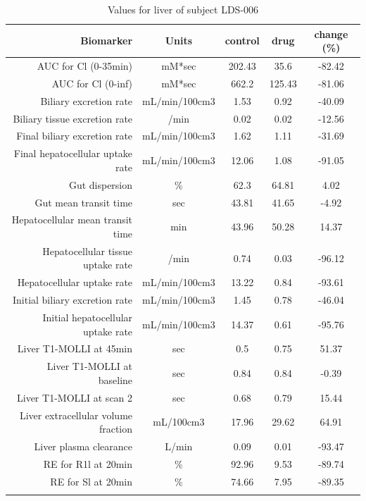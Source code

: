 \documentclass{epflreport}%
\begin{document}
%
\clearpage%
\begin{longtable}{rcccc}%
\hline%
Biomarker&Units&control&drug&change (\%)\\%
\hline%
AUC for Cl (0{-}35min)&mM*sec&202.43&35.6&{-}82.42\\%
AUC for Cl (0{-}inf)&mM*sec&662.2&125.43&{-}81.06\\%
Biliary excretion rate&mL/min/100cm3&1.53&0.92&{-}40.09\\%
Biliary tissue excretion rate&/min&0.02&0.02&{-}12.56\\%
Final biliary excretion rate&mL/min/100cm3&1.62&1.11&{-}31.69\\%
Final hepatocellular uptake rate&mL/min/100cm3&12.06&1.08&{-}91.05\\%
Gut dispersion&\%&62.3&64.81&4.02\\%
Gut mean transit time&sec&43.81&41.65&{-}4.92\\%
Hepatocellular mean transit time&min&43.96&50.28&14.37\\%
Hepatocellular tissue uptake rate&/min&0.74&0.03&{-}96.12\\%
Hepatocellular uptake rate&mL/min/100cm3&13.22&0.84&{-}93.61\\%
Initial biliary excretion rate&mL/min/100cm3&1.45&0.78&{-}46.04\\%
Initial hepatocellular uptake rate&mL/min/100cm3&14.37&0.61&{-}95.76\\%
Liver T1{-}MOLLI at 45min&sec&0.5&0.75&51.37\\%
Liver T1{-}MOLLI at baseline&sec&0.84&0.84&{-}0.39\\%
Liver T1{-}MOLLI at scan 2&sec&0.68&0.79&15.44\\%
Liver extracellular volume fraction&mL/100cm3&17.96&29.62&64.91\\%
Liver plasma clearance&L/min&0.09&0.01&{-}93.47\\%
RE for R1l at 20min&\%&92.96&9.53&{-}89.74\\%
RE for Sl at 20min&\%&74.66&7.95&{-}89.35\\%
\hline%
\caption{Values for liver of subject LDS-006} \\%
\end{longtable}%
\end{document}
